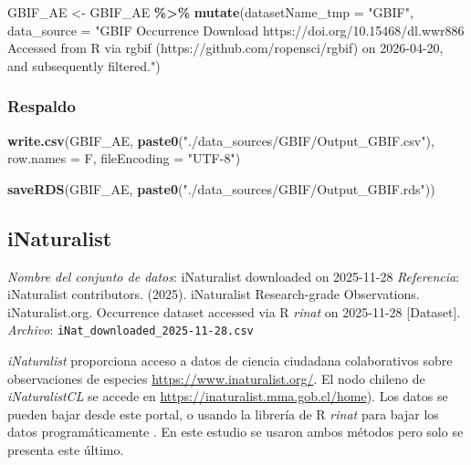 \documentclass[sn-apa,pdflatex]{sn-jnl}
\newenvironment{Shaded}{\begin{snugshade}}{\end{snugshade}}
\newcommand{\AttributeTok}[1]{\textcolor[rgb]{0.13,0.29,0.53}{#1}}
\newcommand{\FunctionTok}[1]{\textcolor[rgb]{0.13,0.29,0.53}{\textbf{#1}}}
\newcommand{\NormalTok}[1]{#1}
\newcommand{\OtherTok}[1]{\textcolor[rgb]{0.56,0.35,0.01}{#1}}
\newcommand{\SpecialCharTok}[1]{\textcolor[rgb]{0.81,0.36,0.00}{\textbf{#1}}}
\newcommand{\StringTok}[1]{\textcolor[rgb]{0.31,0.60,0.02}{#1}}
\begin{document}
\begin{Shaded}
\begin{Highlighting}[]
\NormalTok{GBIF\_AE }\OtherTok{\textless{}{-}}\NormalTok{ GBIF\_AE }\SpecialCharTok{\%\textgreater{}\%}
    \FunctionTok{mutate}\NormalTok{(}\AttributeTok{datasetName\_tmp =} \StringTok{"GBIF"}\NormalTok{, }\AttributeTok{data\_source =} \StringTok{"GBIF Occurrence Download https://doi.org/10.15468/dl.wwr886 Accessed from R via rgbif (https://github.com/ropensci/rgbif) on 2026{-}04{-}20, and subsequently filtered."}\NormalTok{)}
\end{Highlighting}
\end{Shaded}

\subsubsection{Respaldo}\label{respaldo-8}

\begin{Shaded}
\begin{Highlighting}[]
\FunctionTok{write.csv}\NormalTok{(GBIF\_AE, }\FunctionTok{paste0}\NormalTok{(}\StringTok{"./data\_sources/GBIF/Output\_GBIF.csv"}\NormalTok{),}
    \AttributeTok{row.names =}\NormalTok{ F, }\AttributeTok{fileEncoding =} \StringTok{"UTF{-}8"}\NormalTok{)}

\FunctionTok{saveRDS}\NormalTok{(GBIF\_AE, }\FunctionTok{paste0}\NormalTok{(}\StringTok{"./data\_sources/GBIF/Output\_GBIF.rds"}\NormalTok{))}
\end{Highlighting}
\end{Shaded}

\subsection{iNaturalist}\label{inaturalist}

\emph{Nombre del conjunto de datos}: iNaturalist downloaded on
2025-11-28 \emph{Referencia}: iNaturalist contributors. (2025).
iNaturalist Research-grade Observations. iNaturalist.org. Occurrence
dataset accessed via R \emph{rinat} on 2025-11-28 {[}Dataset{]}.
\citep{iNaturalistcontributors}\\
\emph{Archivo}: \texttt{iNat\_downloaded\_2025-11-28.csv}

\emph{iNaturalist} proporciona acceso a datos de ciencia ciudadana
colaborativos sobre observaciones de especies
\url{https://www.inaturalist.org/}. El nodo chileno de
\emph{iNaturalistCL} se accede en
\url{https://inaturalist.mma.gob.cl/home}). Los datos se pueden bajar
desde este portal, o usando la librería de R \emph{rinat} para bajar los
datos programáticamente \citep{Barve2025}. En este estudio se usaron
ambos métodos pero solo se presenta este último.
\end{document}
